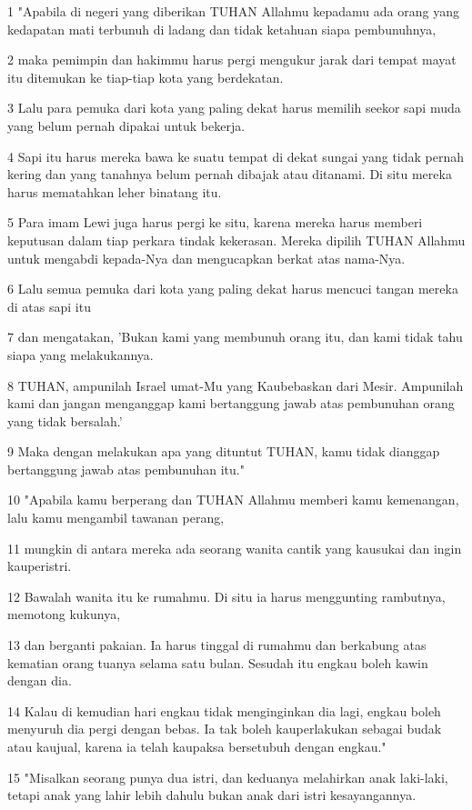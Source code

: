 \par 1 "Apabila di negeri yang diberikan TUHAN Allahmu kepadamu ada orang yang kedapatan mati terbunuh di ladang dan tidak ketahuan siapa pembunuhnya,
\par 2 maka pemimpin dan hakimmu harus pergi mengukur jarak dari tempat mayat itu ditemukan ke tiap-tiap kota yang berdekatan.
\par 3 Lalu para pemuka dari kota yang paling dekat harus memilih seekor sapi muda yang belum pernah dipakai untuk bekerja.
\par 4 Sapi itu harus mereka bawa ke suatu tempat di dekat sungai yang tidak pernah kering dan yang tanahnya belum pernah dibajak atau ditanami. Di situ mereka harus mematahkan leher binatang itu.
\par 5 Para imam Lewi juga harus pergi ke situ, karena mereka harus memberi keputusan dalam tiap perkara tindak kekerasan. Mereka dipilih TUHAN Allahmu untuk mengabdi kepada-Nya dan mengucapkan berkat atas nama-Nya.
\par 6 Lalu semua pemuka dari kota yang paling dekat harus mencuci tangan mereka di atas sapi itu
\par 7 dan mengatakan, 'Bukan kami yang membunuh orang itu, dan kami tidak tahu siapa yang melakukannya.
\par 8 TUHAN, ampunilah Israel umat-Mu yang Kaubebaskan dari Mesir. Ampunilah kami dan jangan menganggap kami bertanggung jawab atas pembunuhan orang yang tidak bersalah.'
\par 9 Maka dengan melakukan apa yang dituntut TUHAN, kamu tidak dianggap bertanggung jawab atas pembunuhan itu."
\par 10 "Apabila kamu berperang dan TUHAN Allahmu memberi kamu kemenangan, lalu kamu mengambil tawanan perang,
\par 11 mungkin di antara mereka ada seorang wanita cantik yang kausukai dan ingin kauperistri.
\par 12 Bawalah wanita itu ke rumahmu. Di situ ia harus menggunting rambutnya, memotong kukunya,
\par 13 dan berganti pakaian. Ia harus tinggal di rumahmu dan berkabung atas kematian orang tuanya selama satu bulan. Sesudah itu engkau boleh kawin dengan dia.
\par 14 Kalau di kemudian hari engkau tidak menginginkan dia lagi, engkau boleh menyuruh dia pergi dengan bebas. Ia tak boleh kauperlakukan sebagai budak atau kaujual, karena ia telah kaupaksa bersetubuh dengan engkau."
\par 15 "Misalkan seorang punya dua istri, dan keduanya melahirkan anak laki-laki, tetapi anak yang lahir lebih dahulu bukan anak dari istri kesayangannya.
